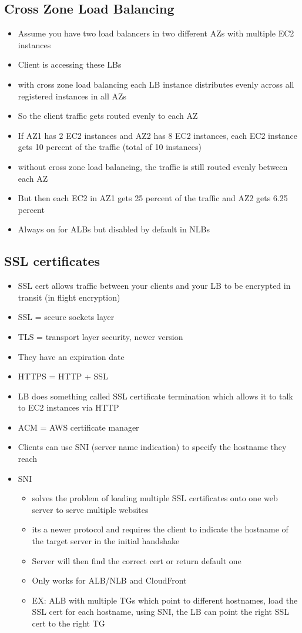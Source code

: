 \documentclass[]{scrartcl}
\begin{document}
\subsection{Cross Zone Load Balancing}
\begin{itemize}
	\item Assume you have two load balancers in two different AZs with multiple EC2 instances
	\item Client is accessing these LBs
	\item with cross zone load balancing each LB instance distributes evenly across all registered instances in all AZs
	\item So the client traffic gets routed evenly to each AZ
	\item If AZ1 has 2 EC2 instances and AZ2 has 8 EC2 instances, each EC2 instance gets 10 percent of the traffic (total of 10 instances)
	\item without cross zone load balancing, the traffic is still routed evenly between each AZ
	\item But then each EC2 in AZ1 gets 25 percent of the traffic and AZ2 gets 6.25 percent
	\item Always on for ALBs but disabled by default in NLBs
\end{itemize}

\subsection{SSL certificates}
\begin{itemize}
	\item SSL cert allows traffic between your clients and your LB to be encrypted in transit (in flight encryption)
	\item SSL = secure sockets layer
	\item TLS = transport layer security, newer version
	\item They have an expiration date
	\item HTTPS = HTTP + SSL
	\item LB does something called SSL certificate termination which allows it to talk to EC2 instances via HTTP
	\item ACM = AWS certificate manager
	\item Clients can use SNI (server name indication) to specify the hostname they reach
	\item SNI
	\begin{itemize}
		\item solves the problem of loading multiple SSL certificates onto one web server to serve multiple websites
		\item its a newer protocol and requires the client to indicate the hostname of the target server in the initial handshake
		\item Server will then find the correct cert or return default one
		\item Only works for ALB/NLB and CloudFront
		\item EX: ALB with multiple TGs which point to different hostnames, load the SSL cert for each hostname, using SNI, the LB can point the right SSL cert to the right TG
	\end{itemize}
\end{itemize}
\end{document}

